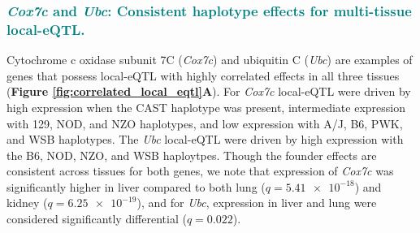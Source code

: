 \documentclass[9pt,twocolumn,twoside]{gsajnl}
\newcommand{\GKinline}[1]{\textcolor{teal}{#1}}
\begin{document}

\subsubsection{\GKinline{\textit{Cox7c} and \textit{Ubc}: Consistent haplotype effects for multi-tissue local-eQTL.}}
Cytochrome c oxidase subunit 7C (\textit{Cox7c}) and ubiquitin C (\textit{Ubc}) are examples of genes that possess local-eQTL with highly correlated effects in all three tissues (\textbf{Figure \ref{fig:correlated_local_eqtl}A}).
For \textit{Cox7c} local-eQTL were driven by high expression when the CAST haplotype was present, intermediate expression with 129, NOD, and NZO haplotypes, and low expression with A/J, B6, PWK, and WSB haplotypes. The \textit{Ubc} local-eQTL were driven by high expression with the B6, NOD, NZO, and WSB haploytpes. Though the founder effects are consistent across tissues for both genes, we note that expression of \textit{Cox7c} was significantly higher in liver compared to both lung ($q = \num{5.41e-18}$) and kidney ($q = \num{6.25e-19}$), and for \textit{Ubc}, expression in liver and lung were considered significantly differential ($q = 0.022$). 


\end{document}
